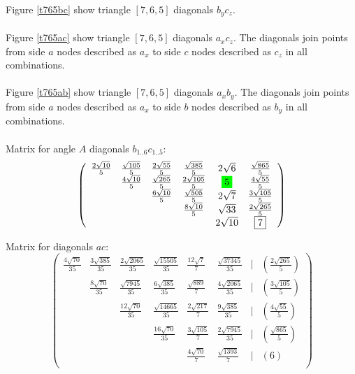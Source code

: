 \documentclass[11pt]{article}
\begin{document}
Figure \ref{t765bc} show triangle $[7,6,5]$ diagonals $b_yc_z$.
\\\\
Figure \ref{t765ac} show triangle $[7,6,5]$ diagonals $a_xc_z$.
The diagonals join points from side $a$ nodes described as $a_x$ to side $c$ nodes described as $c_z$ in all combinations.
\\\\
Figure \ref{t765ab} show triangle $[7,6,5]$ diagonals $a_xb_y$.
The diagonals join points from side $a$ nodes described as $a_x$ to side $b$ nodes described as $b_y$ in all combinations.
\\\\
\newcommand\five{\colorbox{green}{$5$}}
Matrix for angle $A$ diagonals $b_{1..6}c_{1..5}$:
\begin{equation}\label{eq:appendrow}
\left(\begin{array}{cccccc}
	\frac{2\sqrt{10}}{5} & \frac{\sqrt{105}}{5} & \frac{2\sqrt{55}}{5} & \frac{\sqrt{385}}{5} & 2\sqrt{6} & \frac{\sqrt{865}}{5} \\
	& \frac{4\sqrt{10}}{5} & \frac{\sqrt{265}}{5} & \frac{2\sqrt{105}}{5} & \five & \frac{4\sqrt{55}}{5} \\
	& & \frac{6\sqrt{10}}{5} & \frac{\sqrt{505}}{5} & 2\sqrt{7} & \frac{3\sqrt{105}}{5}\\
	& & & \frac{8\sqrt{10}}{5} & \sqrt{33} & \frac{2\sqrt{265}}{5}\\
	& & & & 2\sqrt{10} & \boxed{7} \\
\end{array}\right)
\end{equation}


Matrix for diagonals $ac$:
\begin{equation}\label{eq:appendrow}
\left(\begin{array}{cccccccc}
	\frac{4\sqrt{70}}{35} & \frac{3\sqrt{385}}{35} & \frac{2\sqrt{2065}}{35} & \frac{\sqrt{15505}}{35} & \frac{12\sqrt{7}}{7} & \frac{\sqrt{37345}}{35} & | & (\frac{2\sqrt{265}}{5})\\
	& \frac{8\sqrt{70}}{35} & \frac{\sqrt{7945}}{35} & \frac{6\sqrt{385}}{35} & \frac{\sqrt{889}}{7} & \frac{4\sqrt{2065}}{35} & | & (\frac{3\sqrt{105}}{5}) \\
	& & \frac{12\sqrt{70}}{35} & \frac{\sqrt{14665}}{35} & \frac{2\sqrt{217}}{7} & \frac{9\sqrt{385}}{35} & | & (\frac{4\sqrt{55}}{5})\\
	& & & \frac{16\sqrt{70}}{35} & \frac{3\sqrt{105}}{7} & \frac{2\sqrt{7945}}{35} & | & (\frac{\sqrt{865}}{5})\\
	& & & & \frac{4\sqrt{70}}{7} & \frac{\sqrt{1393}}{7} & | & (\boxed{6})\\
\end{array}\right)
\end{equation}
\end{document}

